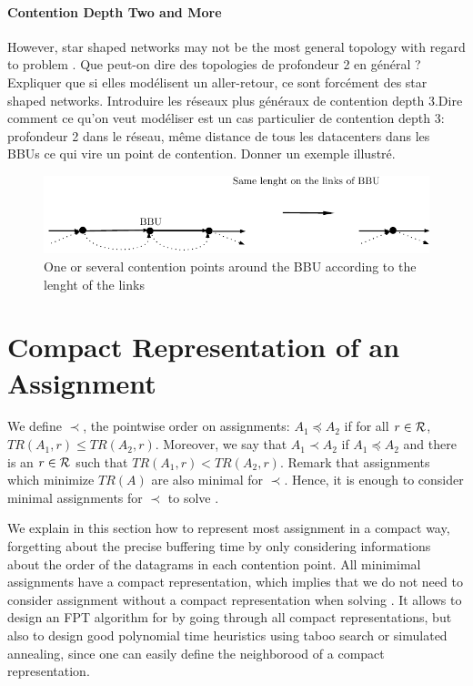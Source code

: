 \documentclass[english]{article}
\begin{document}
\paragraph*{Contention Depth Two and More}

However, star shaped networks may not be the most general topology with regard to problem \spall.
Que peut-on dire des topologies de profondeur 2 en général ? Expliquer que si elles modélisent un aller-retour,
ce sont forcément des star shaped networks.
Introduire les réseaux plus généraux de contention depth 3.Dire comment ce qu'on veut modéliser est un cas particulier de
contention depth 3: profondeur 2 dans le réseau, même
distance de tous les datacenters dans les BBUs ce qui vire un point de contention. Donner un exemple illustré.
   \begin{figure}

	\centering
	\includegraphics[scale=0.8]{bbuaggreg}


\caption{One or several contention points around the BBU according to the lenght of the links}
\label{fig:allerretour}
\end{figure}


\section{Compact Representation of an Assignment}

 We define $\prec$, the pointwise order on assignments: $A_1 \preceq A_2$ if for all $r\in \cal{R}$, $TR(A_1,r) \leq TR(A_2,r)$. Moreover, we say that $A_1 \prec A_2$ if $A_1 \preceq A_2$ and there is an $r \in \cal {R}$ such that  $TR(A_1,r) < TR(A_2,r)$. Remark that assignments which minimize $TR(A)$ are also minimal for $\prec$. Hence, it is enough to consider minimal assignments for $\prec$ to solve \spall.

We explain in this section how to represent most assignment in a compact way, forgetting about the precise buffering time by only considering informations about the order of the datagrams in each contention point. All minimimal assignments have a compact representation, which implies that we do not need to consider assignment without a compact representation when solving \spall. 
It allows to design an FPT algorithm for \spall by going through all compact representations, but also to design good polynomial time heuristics using taboo search or simulated annealing, since one can easily define the neighborood of a compact representation.
\end{document}
